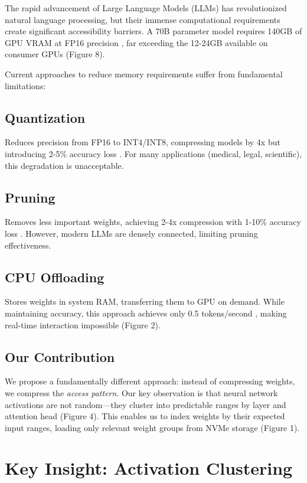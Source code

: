 \documentclass[twocolumn,10pt]{article}
\begin{document}
The rapid advancement of Large Language Models (LLMs) has revolutionized natural language processing, but their immense computational requirements create significant accessibility barriers. A 70B parameter model requires 140GB of GPU VRAM at FP16 precision \cite{touvron2023llama}, far exceeding the 12-24GB available on consumer GPUs (Figure 8).

Current approaches to reduce memory requirements suffer from fundamental limitations:

\subsection{Quantization}
Reduces precision from FP16 to INT4/INT8, compressing models by 4x but introducing 2-5\% accuracy loss \cite{frantar2022gptq}. For many applications (medical, legal, scientific), this degradation is unacceptable.

\subsection{Pruning}
Removes less important weights, achieving 2-4x compression with 1-10\% accuracy loss \cite{han2015deep}. However, modern LLMs are densely connected, limiting pruning effectiveness.

\subsection{CPU Offloading}
Stores weights in system RAM, transferring them to GPU on demand. While maintaining accuracy, this approach achieves only 0.5 tokens/second \cite{llamacpp}, making real-time interaction impossible (Figure 2).

\subsection{Our Contribution}
We propose a fundamentally different approach: instead of compressing weights, we compress the \textit{access pattern}. Our key observation is that neural network activations are not random—they cluster into predictable ranges by layer and attention head (Figure 4). This enables us to index weights by their expected input ranges, loading only relevant weight groups from NVMe storage (Figure 1).

\section{Key Insight: Activation Clustering}
\end{document}
